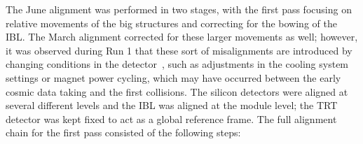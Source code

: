The June alignment was performed in two stages, with the first pass focusing on relative movements of the big structures and correcting for the bowing of the IBL.
The March alignment corrected for these larger movements as well; however, it was observed during Run 1 that these sort of misalignments are introduced by changing conditions in the detector~\cite{2014.alignment-performance-8tev}, such as adjustments in the cooling system settings or magnet power cycling, which may have occurred between the early cosmic data taking and the first  collisions.
The silicon detectors were aligned at several different levels and the IBL was aligned at the module level; the TRT detector was kept fixed to act as a global reference frame.
The full alignment chain for the first pass consisted of the following steps:
